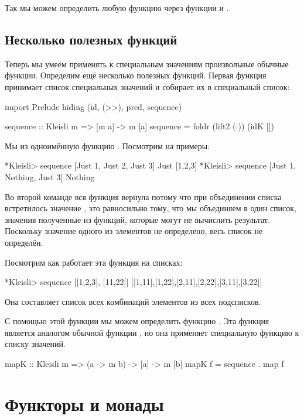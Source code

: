 Так мы можем определить любую функцию  через
функции  и \In{$$}.

\subsection{Несколько полезных функций}

Теперь мы умеем применять к специальным значениям
произвольные обычные функции. Определим ещё несколько 
полезных функций. Первая функция принимает список
специальных значений и собирает их в специальный список:

\begin{code}
import Prelude hiding (id, (>>), pred, sequence)

sequence :: Kleisli m => [m a] -> m [a]
sequence = foldr (lift2 (:)) (idK []) 
\end{code}

Мы  из  одноимённую
функцию . Посмотрим на примеры:

\begin{code}
*Kleisli> sequence [Just 1, Just 2, Just 3]
Just [1,2,3]
*Kleisli> sequence [Just 1, Nothing, Just 3]
Nothing
\end{code}

Во второй команде вся функция вернула  потому что
при объединении списка встретилось значение , это
равносильно тому, что мы объединяем в один список, значения
полученные из функций, которые могут не вычислить результат. 
Поскольку значение одного из элементов не определено, весь список
не определён.

Посмотрим как работает эта функция на списках:

\begin{code}
*Kleisli> sequence [[1,2,3], [11,22]]
[[1,11],[1,22],[2,11],[2,22],[3,11],[3,22]]
\end{code}

Она составляет список всех комбинаций элементов из всех
подсписков. 

С помощью этой функции мы можем определить функцию .
Эта функция является аналогом обычной функции , но
она применяет специальную функцию к списку значений.

\begin{code}
mapK :: Kleisli m => (a -> m b) -> [a] -> m [b]
mapK f = sequence . map f
\end{code}

\section{Функторы и монады}

